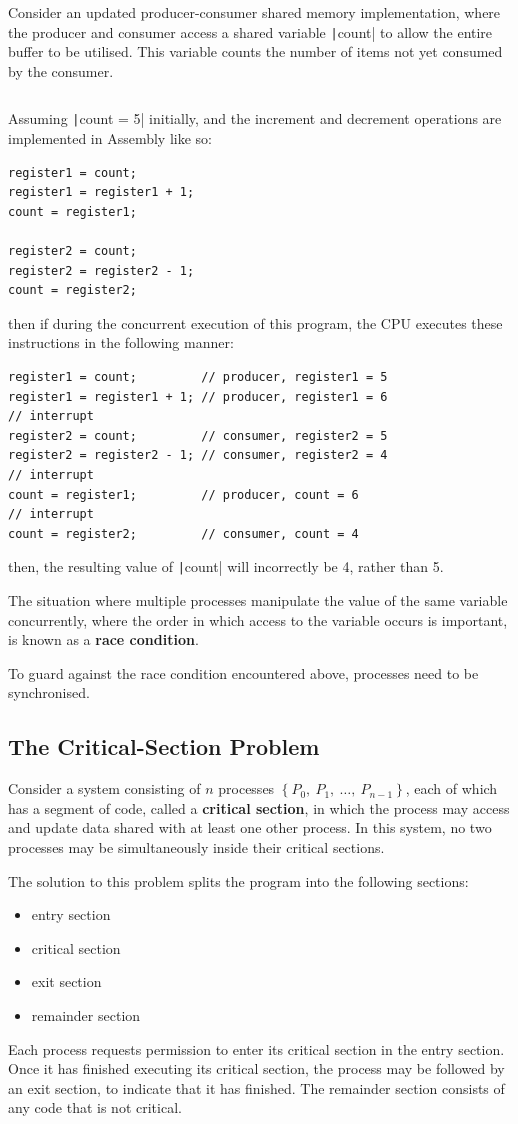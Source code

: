 \documentclass{article}
\begin{document}
Consider an updated producer-consumer shared memory implementation,
where the producer and consumer access a shared variable
\texttt|count| to allow the entire buffer to be utilised. This
variable counts the number of items not yet consumed by the consumer.
\inputminted{c}{code/producer_consumer_synchronisation.c} Assuming
\texttt|count = 5| initially, and the increment and decrement
operations are implemented in Assembly like so:
\begin{verbatim}
register1 = count;
register1 = register1 + 1;
count = register1;

register2 = count;
register2 = register2 - 1;
count = register2;
\end{verbatim}
then if during the concurrent execution of this program, the CPU
executes these instructions in the following manner:
\begin{verbatim}
register1 = count;         // producer, register1 = 5
register1 = register1 + 1; // producer, register1 = 6
// interrupt
register2 = count;         // consumer, register2 = 5
register2 = register2 - 1; // consumer, register2 = 4
// interrupt
count = register1;         // producer, count = 6
// interrupt
count = register2;         // consumer, count = 4
\end{verbatim}
then, the resulting value of \texttt|count| will incorrectly be
4, rather than 5.

The situation where multiple processes manipulate the value of the same
variable concurrently, where the order in which access to the variable
occurs is important, is known as a \textbf{race condition}.

To guard against the race condition encountered above, processes need
to be synchronised.
\subsection{The Critical-Section Problem}
Consider a system consisting of \(n\) processes \(\left\{ P_0,\: P_1,\:
\dots,\: P_{n-1} \right\}\), each of which has a segment of code,
called a \textbf{critical section}, in which the process may access and
update data shared with at least one other process. In this system, no
two processes may be simultaneously inside their critical sections.

The solution to this problem splits the program into the following
sections:
\begin{itemize}
    \item entry section
    \item critical section
    \item exit section
    \item remainder section
\end{itemize}
Each process requests permission to enter its critical section in the
entry section. Once it has finished executing its critical section, the
process may be followed by an exit section, to indicate that it has
finished. The remainder section consists of any code that is not
critical.
\end{document}
